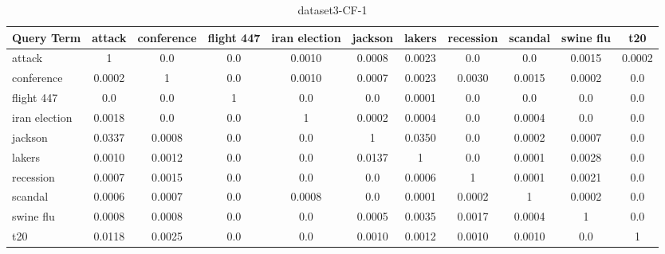 \documentclass{sig-alternate}
\begin{document}
\begin{table}[!ht]
\centering
\resizebox{14cm}{!} 
{
	\begin{tabular}{|l|c|c|c|c|c|c|c|c|c|c|}
	\hline
	Query Term & attack & conference & flight 447 & iran election & jackson & lakers & recession & scandal & swine flu & t20\\
	\hline
	attack & 1 & 0.0 & 0.0 & 0.0010 & 0.0008 & 0.0023 & 0.0 & 0.0 & 0.0015 & 0.0002\\
	\hline	
conference  & 0.0002 & 1 & 0.0 & 0.0010 & 0.0007 & 0.0023 & 0.0030 & 0.0015 & 0.0002 & 0.0\\
	 	\hline
flight 447 & 0.0 & 0.0 & 1 & 0.0  & 0.0 & 0.0001 & 0.0 & 0.0 & 0.0 & 0.0\\
	  	\hline
iran election	& 0.0018	 & 0.0 & 0.0 & 1 & 0.0002 & 0.0004 & 0.0 & 0.0004 & 0.0 & 0.0 \\
	   	\hline
jackson	  & 0.0337 & 0.0008 & 0.0 & 0.0  & 1 & 0.0350 & 0.0 & 0.0002 & 0.0007 & 0.0\\
	   	\hline
lakers	  & 0.0010 & 0.0012 & 0.0 & 0.0 & 0.0137 & 1 & 0.0 & 0.0001 & 0.0028 & 0.0\\
	    	\hline
recession  & 0.0007 & 0.0015 & 0.0 & 0.0 & 0.0 & 0.0006 & 1 & 0.0001 & 0.0021 & 0.0\\
	     	\hline
scandal & 0.0006 & 0.0007 & 0.0 & 0.0008 & 0.0 & 0.0001 & 0.0002 & 1 & 0.0002 & 0.0\\
	      	\hline
swine flu & 0.0008 & 0.0008 & 0.0 & 0.0 & 0.0005 & 0.0035 & 0.0017 & 0.0004 & 1 & 0.0\\
	       \hline
t20 & 0.0118 & 0.0025 & 0.0 & 0.0 & 0.0010 & 0.0012 & 0.0010 & 0.0010 & 0.0 & 1\\
	\hline
	\end{tabular}
}
\caption{dataset3-CF-1}\label{cf2}
\end{table}
\end{document}
